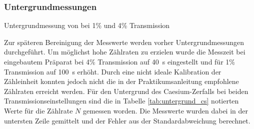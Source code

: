 \documentclass[11pt, a4paper]{article}
\numberwithin{equation}{section}
\begin{document}
\subsubsection{Untergrundmessungen}
\label{sssec:untergrund1}
\begin{table}
	\centering
	
	\caption{Untergrundmessung von  bei 1\% und 4\% Transmission}
	\label{tab:untergrund_cs}
\end{table}
Zur späteren Bereinigung der Messwerte werden vorher Untergrundmessungen durchgeführt.
Um möglichst hohe Zählraten zu erzielen wurde die Messzeit bei eingebautem Präparat bei 4\% Transmission auf \SI{40}{\second} eingestellt und für 1\% Transmission auf \SI{100}{\second} erhöht.
Durch eine nicht ideale Kalibration der Zähleinheit konnten jedoch nicht die in der Praktikumsanleitung empfohlene Zählraten erreicht werden.
Für den Untergrund des Caesium-Zerfalls bei beiden Transmissionseinstellungen sind die in Tabelle \ref{tab:untergrund_cs} notierten Werte für die Zählrate $N$ gemessen worden.
Die Messwerte wurden dabei in der untersten Zeile gemittelt und der Fehler aus der Standardabweichung berechnet.
\end{document}
